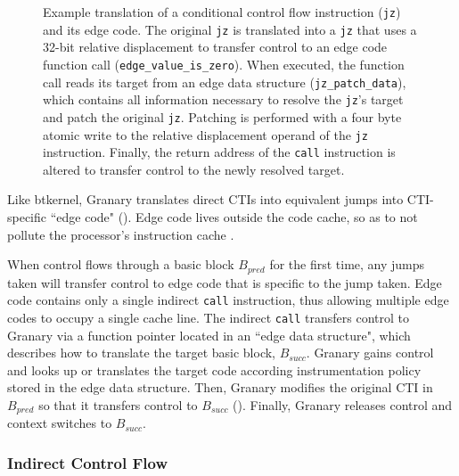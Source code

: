 \documentclass[preprint]{sigplanconf}
\begin{document}
\begin{figure}[t!]
\hfill
{}
\caption{\label{fig:direct_edge_code}Example translation of a conditional control flow instruction (\texttt{jz}) and its edge code. The original \texttt{jz} is translated into a \texttt{jz} that uses a 32-bit relative displacement to transfer control to an edge code function call (\texttt{edge\_value\_is\_zero}). When executed, the function call reads its target from an edge data structure (\texttt{jz\_patch\_data}), which contains all information necessary to resolve the \texttt{jz}'s target and patch the original \texttt{jz}. Patching is performed with a four byte atomic write to the relative displacement operand of the \texttt{jz} instruction. Finally, the return address of the \texttt{call} instruction is altered to transfer control to the newly resolved target.}
\end{figure}
Like btkernel, Granary translates direct CTIs into equivalent jumps into CTI-specific ``edge code" (). Edge code lives outside the code cache, so as to not pollute the processor's instruction cache \cite{btkernel}.

When control flows through a basic block $B_{pred}$ for the first time, any jumps taken will transfer control to edge code that is specific to the jump taken. Edge code contains only a single indirect \texttt{call} instruction, thus allowing multiple edge codes to occupy a single cache line. The indirect \texttt{call} transfers control to Granary via a function pointer located in an ``edge data structure", which describes how to translate the target basic block, $B_{succ}$. Granary gains control and looks up or translates the target code according instrumentation policy stored in the edge data structure. Then, Granary modifies the original CTI in $B_{pred}$ so that it transfers control to $B_{succ}$  (). Finally, Granary releases control and context switches to $B_{succ}$.


\subsubsection{Indirect Control Flow}\label{sec:ibl}
\end{document}
